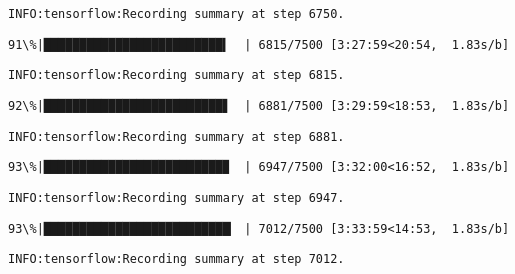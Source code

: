 \documentclass[11pt]{article}
\begin{document}
    \begin{Verbatim}[commandchars=\\\{\}]
INFO:tensorflow:Recording summary at step 6750.

    \end{Verbatim}

    \begin{Verbatim}[commandchars=\\\{\}]
 91\%|█████████████████████████▍  | 6815/7500 [3:27:59<20:54,  1.83s/b]
    \end{Verbatim}

    \begin{Verbatim}[commandchars=\\\{\}]
INFO:tensorflow:Recording summary at step 6815.

    \end{Verbatim}

    \begin{Verbatim}[commandchars=\\\{\}]
 92\%|█████████████████████████▋  | 6881/7500 [3:29:59<18:53,  1.83s/b]
    \end{Verbatim}

    \begin{Verbatim}[commandchars=\\\{\}]
INFO:tensorflow:Recording summary at step 6881.

    \end{Verbatim}

    \begin{Verbatim}[commandchars=\\\{\}]
 93\%|█████████████████████████▉  | 6947/7500 [3:32:00<16:52,  1.83s/b]
    \end{Verbatim}

    \begin{Verbatim}[commandchars=\\\{\}]
INFO:tensorflow:Recording summary at step 6947.

    \end{Verbatim}

    \begin{Verbatim}[commandchars=\\\{\}]
 93\%|██████████████████████████▏ | 7012/7500 [3:33:59<14:53,  1.83s/b]
    \end{Verbatim}

    \begin{Verbatim}[commandchars=\\\{\}]
INFO:tensorflow:Recording summary at step 7012.

    \end{Verbatim}
\end{document}
